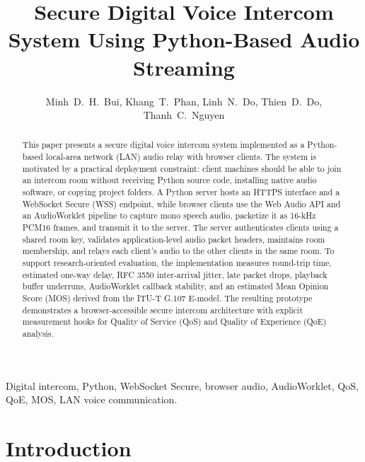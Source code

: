 \documentclass[conference]{IEEEtran}
\begin{document}
\title{Secure Digital Voice Intercom System Using Python-Based Audio Streaming}

\author{Minh~D.~H.~Bui,
        Khang~T.~Phan,
        Linh~N.~Do,
        Thien~D.~Do,
        Thanh~C.~Nguyen\\
}

\maketitle

\begin{abstract}
This paper presents a secure digital voice intercom system implemented as a Python-based local-area network (LAN) audio relay with browser clients. The system is motivated by a practical deployment constraint: client machines should be able to join an intercom room without receiving Python source code, installing native audio software, or copying project folders. A Python server hosts an HTTPS interface and a WebSocket Secure (WSS) endpoint, while browser clients use the Web Audio API and an AudioWorklet pipeline to capture mono speech audio, packetize it as 16-kHz PCM16 frames, and transmit it to the server. The server authenticates clients using a shared room key, validates application-level audio packet headers, maintains room membership, and relays each client's audio to the other clients in the same room. To support research-oriented evaluation, the implementation measures round-trip time, estimated one-way delay, RFC 3550 inter-arrival jitter, late packet drops, playback buffer underruns, AudioWorklet callback stability, and an estimated Mean Opinion Score (MOS) derived from the ITU-T G.107 E-model. The resulting prototype demonstrates a browser-accessible secure intercom architecture with explicit measurement hooks for Quality of Service (QoS) and Quality of Experience (QoE) analysis.
\end{abstract}

\begin{IEEEkeywords}
Digital intercom, Python, WebSocket Secure, browser audio, AudioWorklet, QoS, QoE, MOS, LAN voice communication.
\end{IEEEkeywords}

\section{Introduction}
\end{document}
